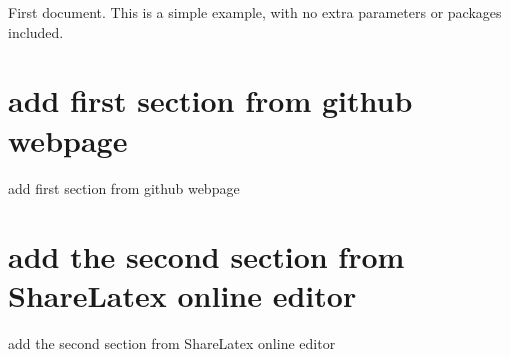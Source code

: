 \documentclass{article}
\begin{document}
First document. This is a simple example, with no 
extra parameters or packages included.

\section{add first section from github webpage}
add first section from github webpage

\section{add the second section from ShareLatex online editor}
add the second section from ShareLatex online editor
\end{document}
